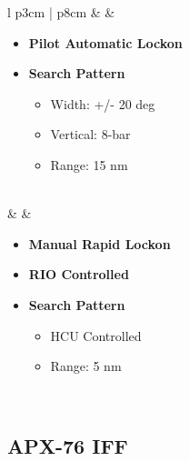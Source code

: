 \documentclass[8pt,usenames,dvipsnames,twoside]{article}
\begin{document}
\begin{center}
\begin{longtable}{l p{3cm} | p{8cm}}
				\midrule
				\textbullet &  &  
				\begin{minipage}[t]{\linewidth}
					\vspace{-7pt}
					\begin{itemize}
						\item \textbf{Pilot Automatic Lockon}
						\item \textbf{Search Pattern}
						\begin{itemize}
							\item Width: +/- 20 deg
							\item Vertical: 8-bar
							\item Range: 15 nm
						\end{itemize}
					\end{itemize}
				\end{minipage} \\
				\midrule
				\textbullet &  &  
				\begin{minipage}[t]{\linewidth}
					\vspace{-7pt}
					\begin{itemize}
						\item \textbf{Manual Rapid Lockon}
						\item \textbf{RIO Controlled}
						\item \textbf{Search Pattern}
						\begin{itemize}
							\item HCU Controlled
							\item Range: 5 nm
						\end{itemize}
					\end{itemize}
				\end{minipage} \\
				\bottomrule
			\end{longtable}
		\end{center}
	
		\subsection{APX-76 IFF}
		
		
		\cleardoublepage
			
		\hypertarget{subsec:tidsymb}{}
\end{document}
